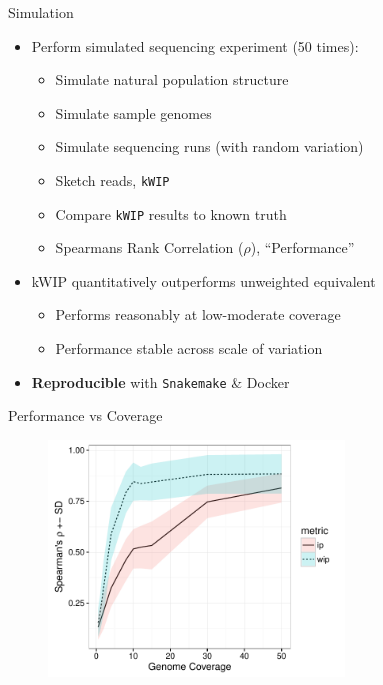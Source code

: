 \documentclass[t]{beamer}
\begin{document}
\begin{frame}{Simulation}
  \begin{itemize}
    \item Perform simulated sequencing experiment (50 times):
    \begin{itemize}
      \item Simulate natural population structure\autocite{staab_scrm:_2015}
      \item Simulate sample genomes\autocite{cartwright_dna_2005}
      \item Simulate sequencing runs (with random variation)\autocite{holtgrewe_mason_2010}
      \item Sketch reads, \texttt{kWIP}
      \item Compare \texttt{kWIP} results to known truth
      \item Spearmans Rank Correlation ($\rho$),  ``Performance''
    \end{itemize}
    \item kWIP quantitatively outperforms unweighted equivalent
      \begin{itemize}
        \item Performs reasonably at low-moderate coverage
        \item Performance stable across scale of variation
      \end{itemize}
    \item \textbf{Reproducible} with \texttt{Snakemake} \& Docker
  \end{itemize}
\end{frame}

\begin{frame}{Performance vs Coverage}
  \begin{figure}
    \centering
    \includegraphics[width=0.7\textwidth]{img/coverage-vs-rho_50x.pdf}
  \end{figure}
\end{frame}
\end{document}
